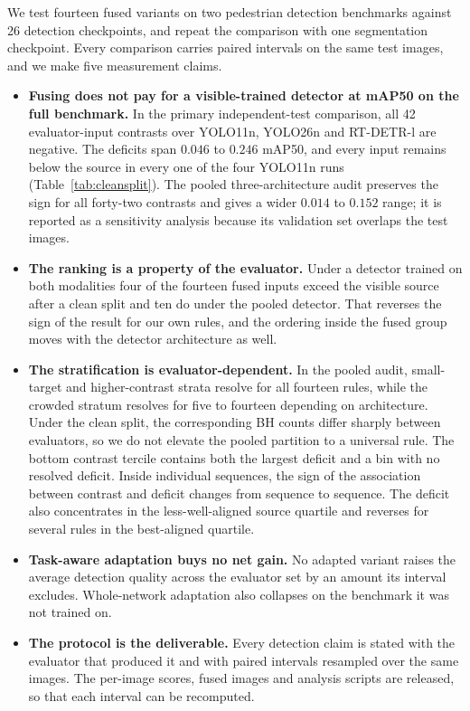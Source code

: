 \documentclass[preprint,10pt]{elsarticle}
\begin{document}
We test fourteen fused variants on two pedestrian detection benchmarks against 26
detection checkpoints, and repeat the comparison with one segmentation checkpoint.
Every comparison carries paired intervals on the same test images, and we make five
measurement claims.

\begin{itemize}\setlength\itemsep{0pt}
\item[(i)] \textbf{Fusing does not pay for a visible-trained detector at mAP50 on the full
benchmark.} In the primary independent-test comparison, all 42 evaluator-input
contrasts over YOLO11n, YOLO26n and RT-DETR-l are negative. The deficits span $0.046$
to $0.246$ mAP50, and every input remains below the source in every one of the four
YOLO11n runs (Table~\ref{tab:cleansplit}). The pooled
three-architecture audit preserves the sign for all forty-two contrasts and gives a
wider $0.014$ to $0.152$ range; it is reported as a sensitivity analysis because its
validation set overlaps the test images.
\item[(ii)] \textbf{The ranking is a property of the evaluator.} Under a detector
trained on both modalities four of the fourteen fused inputs exceed the visible source
after a clean split and ten do under the pooled detector. That reverses the sign of the
result for our own rules, and the ordering inside the fused group moves with the detector
architecture as well.
\item[(iii)] \textbf{The stratification is evaluator-dependent.} In the pooled audit,
small-target and higher-contrast strata resolve for all fourteen rules, while the
crowded stratum resolves for five to fourteen depending on architecture. Under the
clean split, the corresponding BH counts differ sharply between evaluators, so we do
not elevate the pooled partition to a universal rule. The bottom contrast tercile
contains both the largest deficit and a bin with no resolved deficit. Inside individual
sequences, the sign of the association between contrast and deficit changes from
sequence to sequence. The deficit also concentrates in the less-well-aligned source
quartile and reverses for several rules in the best-aligned quartile.
\item[(iv)] \textbf{Task-aware adaptation buys no net gain.} No adapted variant raises
the average detection quality across the evaluator set by an amount its interval
excludes. Whole-network adaptation also collapses on the benchmark it was not trained
on.
\item[(v)] \textbf{The protocol is the deliverable.} Every detection claim is stated
with the evaluator that produced it and with paired intervals resampled over the same
images. The per-image scores, fused images and analysis scripts are released, so that
each interval can be recomputed.
\end{itemize}
\end{document}
